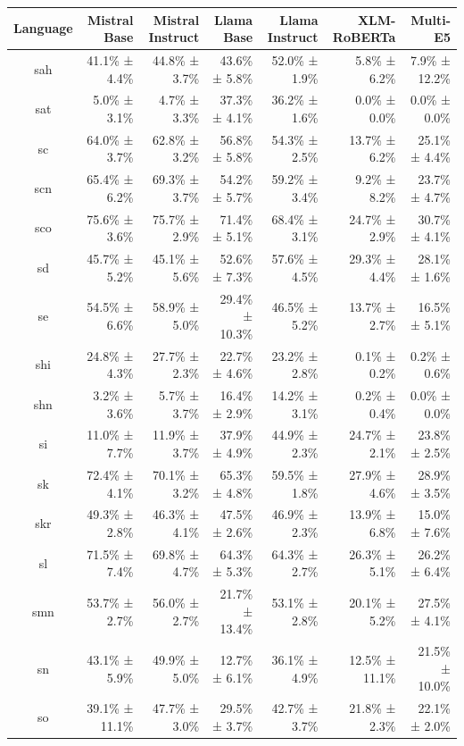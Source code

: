 \documentclass[10pt, a4paper]{article}
\begin{document}
\begin{table}[h]
\centering
\scriptsize
\begin{tabular}{crrrrrr}
\hline
\textbf{Language} & \textbf{Mistral Base} & \textbf{Mistral Instruct} & \textbf{Llama Base} & \textbf{Llama Instruct} & \textbf{XLM-RoBERTa} & \textbf{Multi-E5} \\
\hline
sah & 41.1\% ± 4.4\% & 44.8\% ± 3.7\% & 43.6\% ± 5.8\% & 52.0\% ± 1.9\% & 5.8\% ± 6.2\% & 7.9\% ± 12.2\% \\
sat & 5.0\% ± 3.1\% & 4.7\% ± 3.3\% & 37.3\% ± 4.1\% & 36.2\% ± 1.6\% & 0.0\% ± 0.0\% & 0.0\% ± 0.0\% \\
sc & 64.0\% ± 3.7\% & 62.8\% ± 3.2\% & 56.8\% ± 5.8\% & 54.3\% ± 2.5\% & 13.7\% ± 6.2\% & 25.1\% ± 4.4\% \\
scn & 65.4\% ± 6.2\% & 69.3\% ± 3.7\% & 54.2\% ± 5.7\% & 59.2\% ± 3.4\% & 9.2\% ± 8.2\% & 23.7\% ± 4.7\% \\
sco & 75.6\% ± 3.6\% & 75.7\% ± 2.9\% & 71.4\% ± 5.1\% & 68.4\% ± 3.1\% & 24.7\% ± 2.9\% & 30.7\% ± 4.1\% \\
sd & 45.7\% ± 5.2\% & 45.1\% ± 5.6\% & 52.6\% ± 7.3\% & 57.6\% ± 4.5\% & 29.3\% ± 4.4\% & 28.1\% ± 1.6\% \\
se & 54.5\% ± 6.6\% & 58.9\% ± 5.0\% & 29.4\% ± 10.3\% & 46.5\% ± 5.2\% & 13.7\% ± 2.7\% & 16.5\% ± 5.1\% \\
shi & 24.8\% ± 4.3\% & 27.7\% ± 2.3\% & 22.7\% ± 4.6\% & 23.2\% ± 2.8\% & 0.1\% ± 0.2\% & 0.2\% ± 0.6\% \\
shn & 3.2\% ± 3.6\% & 5.7\% ± 3.7\% & 16.4\% ± 2.9\% & 14.2\% ± 3.1\% & 0.2\% ± 0.4\% & 0.0\% ± 0.0\% \\
si & 11.0\% ± 7.7\% & 11.9\% ± 3.7\% & 37.9\% ± 4.9\% & 44.9\% ± 2.3\% & 24.7\% ± 2.1\% & 23.8\% ± 2.5\% \\
sk & 72.4\% ± 4.1\% & 70.1\% ± 3.2\% & 65.3\% ± 4.8\% & 59.5\% ± 1.8\% & 27.9\% ± 4.6\% & 28.9\% ± 3.5\% \\
skr & 49.3\% ± 2.8\% & 46.3\% ± 4.1\% & 47.5\% ± 2.6\% & 46.9\% ± 2.3\% & 13.9\% ± 6.8\% & 15.0\% ± 7.6\% \\
sl & 71.5\% ± 7.4\% & 69.8\% ± 4.7\% & 64.3\% ± 5.3\% & 64.3\% ± 2.7\% & 26.3\% ± 5.1\% & 26.2\% ± 6.4\% \\
smn & 53.7\% ± 2.7\% & 56.0\% ± 2.7\% & 21.7\% ± 13.4\% & 53.1\% ± 2.8\% & 20.1\% ± 5.2\% & 27.5\% ± 4.1\% \\
sn & 43.1\% ± 5.9\% & 49.9\% ± 5.0\% & 12.7\% ± 6.1\% & 36.1\% ± 4.9\% & 12.5\% ± 11.1\% & 21.5\% ± 10.0\% \\
so & 39.1\% ± 11.1\% & 47.7\% ± 3.0\% & 29.5\% ± 3.7\% & 42.7\% ± 3.7\% & 21.8\% ± 2.3\% & 22.1\% ± 2.0\% \\

\end{tabular}
\end{table}
\end{document}
